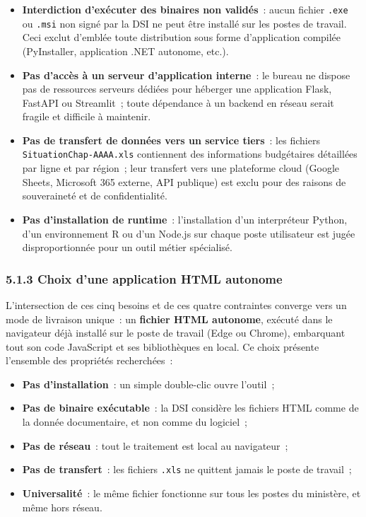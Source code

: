 \begin{itemize}
    \item \textbf{Interdiction d'ex\'ecuter des binaires non valid\'es}~:
    aucun fichier \texttt{.exe} ou \texttt{.msi} non sign\'e par la DSI ne
    peut \^etre install\'e sur les postes de travail. Ceci exclut d'embl\'ee
    toute distribution sous forme d'application compil\'ee
    (PyInstaller, application .NET autonome, etc.).
    \item \textbf{Pas d'acc\`es \`a un serveur d'application interne}~: le
    bureau ne dispose pas de ressources serveurs d\'edi\'ees pour h\'eberger
    une application Flask, FastAPI ou Streamlit~; toute d\'ependance \`a un
    backend en r\'eseau serait fragile et difficile \`a maintenir.
    \item \textbf{Pas de transfert de donn\'ees vers un service tiers}~: les
    fichiers \texttt{SituationChap-AAAA.xls} contiennent des informations
    budg\'etaires d\'etaill\'ees par ligne et par r\'egion~; leur transfert
    vers une plateforme cloud (Google Sheets, Microsoft 365 externe, API
    publique) est exclu pour des raisons de souverainet\'e et de
    confidentialit\'e.
    \item \textbf{Pas d'installation de runtime}~: l'installation d'un
    interpr\'eteur Python, d'un environnement R ou d'un Node.js sur chaque
    poste utilisateur est jug\'ee disproportionn\'ee pour un outil
    m\'etier sp\'ecialis\'e.
\end{itemize}

\subsubsection*{5.1.3 \quad Choix d'une application HTML autonome}

L'intersection de ces cinq besoins et de ces quatre contraintes converge
vers un mode de livraison unique~: un \textbf{fichier HTML autonome},
ex\'ecut\'e dans le navigateur d\'ej\`a install\'e sur le poste de travail
(Edge ou Chrome), embarquant tout son code JavaScript et ses biblioth\`eques
en local. Ce choix pr\'esente l'ensemble des propri\'et\'es recherch\'ees~:

\begin{itemize}
    \item \textbf{Pas d'installation}~: un simple double-clic ouvre l'outil~;
    \item \textbf{Pas de binaire ex\'ecutable}~: la DSI consid\`ere les
    fichiers HTML comme de la donn\'ee documentaire, et non comme du logiciel~;
    \item \textbf{Pas de r\'eseau}~: tout le traitement est local au navigateur~;
    \item \textbf{Pas de transfert}~: les fichiers \texttt{.xls} ne quittent
    jamais le poste de travail~;
    \item \textbf{Universalit\'e}~: le m\^eme fichier fonctionne sur tous les
    postes du minist\`ere, et m\^eme hors r\'eseau.
\end{itemize}

